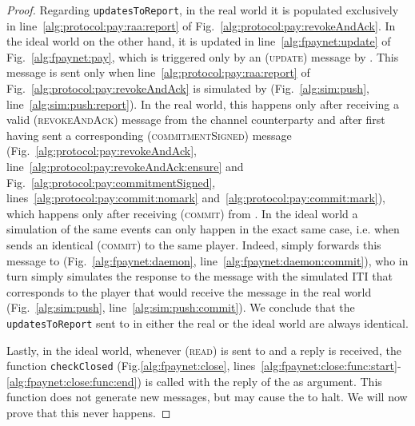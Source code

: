 \begin{proof}
  Regarding \texttt{updatesToReport}, in the real world it is populated
  exclusively in line~\ref{alg:protocol:pay:raa:report} of
  Fig.~\ref{alg:protocol:pay:revokeAndAck}. In the ideal world on the other
  hand, it is updated in line~\ref{alg:fpaynet:update} of
  Fig.~\ref{alg:fpaynet:pay}, which is triggered only by an (\textsc{update})
  message by \simulator. This message is sent only when
  line~\ref{alg:protocol:pay:raa:report} of
  Fig.~\ref{alg:protocol:pay:revokeAndAck} is simulated by \simulator{}
  (Fig.~\ref{alg:sim:push}, line~\ref{alg:sim:push:report}). In the real world,
  this happens only after receiving a valid (\textsc{revokeAndAck}) message from
  the channel counterparty and after first having sent a corresponding
  (\textsc{commitmentSigned}) message (Fig.~\ref{alg:protocol:pay:revokeAndAck},
  line~\ref{alg:protocol:pay:revokeAndAck:ensure} and
  Fig.~\ref{alg:protocol:pay:commitmentSigned},
  lines~\ref{alg:protocol:pay:commit:nomark}
  and~\ref{alg:protocol:pay:commit:mark}), which happens only after receiving
  (\textsc{commit}) from \environment. In the ideal world a simulation of the
  same events can only happen in the exact same case, i.e. when \environment{}
  sends an identical (\textsc{commit}) to the same player. Indeed, \fpaynet{}
  simply forwards this message to \simulator{} (Fig.~\ref{alg:fpaynet:daemon},
  line~\ref{alg:fpaynet:daemon:commit}), who in turn simply simulates the
  response to the message with the simulated ITI that corresponds to the player
  that would receive the message in the real world (Fig.~\ref{alg:sim:push},
  line~\ref{alg:sim:push:commit}). We conclude that the \texttt{updatesToReport}
  sent to \environment{} in either the real or the ideal world are always
  identical.

  Lastly, in the ideal world, whenever (\textsc{read}) is sent to \ledger{} and
  a reply is received, the function \texttt{checkClosed}
  (Fig.\ref{alg:fpaynet:close},
  lines~\ref{alg:fpaynet:close:func:start}-\ref{alg:fpaynet:close:func:end}) is
  called with the reply of the \ledger{} as argument. This function does not
  generate new messages, but may cause the \fpaynet{} to halt. We will now prove
  that this never happens.


\end{proof}

